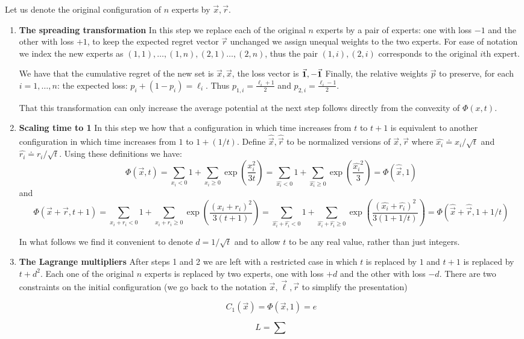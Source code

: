 \documentclass{article}[12pt]
\theoremstyle{plain}
\newcommand{\vx}{\vec{x}}
\newcommand{\vr}{\vec{r}}
\newcommand{\vp}{\vec{p}}
\newcommand{\vl}{\vec{\ell}}
\begin{document}
Let us denote the original configuration of $n$ experts by $\vx, \vr$.

\begin{enumerate}
\item{\bf The spreading transformation} In this step we replace each
  of the original $n$ experts by a pair of experts: one with loss $-1$
  and the other with loss $+1$, to keep the expected regret vector
  $\vr$  unchanged we assign unequal weights to the two
  experts.  For ease of notation we index the new experts as
  $(1,1),\ldots,(1,n),(2,1)\ldots,(2,n)$, thus the pair $(1,i),(2,i)$
  corresponds to the original $i$th expert. 

  We have that the cumulative regret of the new set is $\vx,\vx$, the
  loss vector is $\vec{\mathbf 1},-\vec{\mathbf 1}$ Finally, the relative weights
  $\vp$ to preserve, for each $i=1,\ldots,n$: the expected loss:
  $p_i+(1-p_i)=\ell_i$. Thus $p_{1,i}=\frac{\ell_i+1}{2}$ and
  $p_{2,i}=\frac{\ell_i-1}{2}$. 

  That this transformation can only increase the average potential at
  the next step follows directly from the convexity of $\Phi(x,t)$.

\item {\bf Scaling time to 1}
\newcommand{\nvx}{\widehat{\vx}}
\newcommand{\nxi}{\widehat{x_i}}
\newcommand{\nvr}{\widehat{\vr}}
\newcommand{\nri}{\widehat{r_i}}
In this step we how that a configuration in which time increases from $t$ to
$t+1$ is equivalent to another configuration in which time increases
from $1$ to $1+(1/t)$. Define $\nvx, \nvr$ to be normalized versions of
$\vx,\vr$ where $\nxi \doteq x_i/\sqrt{t}$ and $\nri \doteq
r_i/\sqrt{t}$. Using these definitions we have:
\[
\Phi(\vx,t) = \sum_{x_i < 0} 1 +\sum_{x_i \geq 0} \exp\left(\frac{x_i^2}{3t}\right) 
=  \sum_{\nxi < 0} 1 + \sum_{\nxi \geq 0} \exp\left(\frac{\nxi^2}{3}\right)=\Phi(\nvx,1) 
\]
and
\[
\Phi(\vx+\vr,t+1) = \sum_{x_i+r_i < 0} 1 
+ \sum_{x_i+r_i \geq 0} \exp\left(\frac{(x_i+r_i)^2}{3(t+1)}\right) 
= \sum_{\nxi+\nri < 0} 1 
+ \sum_{\nxi+\nri \geq 0} \exp\left(\frac{(\nxi+\nri)^2}{3(1+1/t)}\right)
=\Phi(\nvx+\nvr,1+1/t) 
\]

In what follows we find it convenient to denote $d=1/\sqrt{t}$ and to
allow $t$ to be any real value, rather than just integers.

\item {\bf The Lagrange multipliers}
After steps 1 and 2 we are left with a restricted case in which $t$ is
replaced by $1$ and $t+1$ is replaced by $t+d^2$. Each one of the
original $n$ experts is replaced by two experts, one with loss $+d$
and the other with loss $-d$. There are two constraints on the initial
configuration (we go back to the notation $\vx,\vl,\vr$ to simplify the
presentation)
 
\begin{equation}
C_1(\vx)=\Phi(\vx,1)=e
\end{equation}

\begin{equation}
L=\sum
\end{equation}


\end{enumerate}
\end{document}
